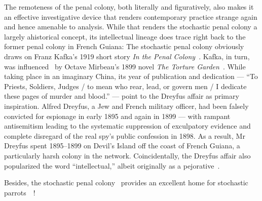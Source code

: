 The remoteness of the penal colony, both literally and figuratively, also makes
it an effective investigative device that renders contemporary practice strange
again and hence amenable to analysis. While that renders the stochastic penal
colony a largely ahistorical concept, its intellectual lineage does trace right
back to the former penal colony in French Guiana: The stochastic penal colony
obviously draws on Franz Kafka's 1919 short story \emph{In the Penal
Colony}~\cite{Kafka1995}. Kafka, in turn, was influenced~\cite{Robertson2017} by
Octave Mirbeau's 1899 novel \emph{The Torture Garden}~\cite{Mirbeau2008}. While
taking place in an imaginary China, its year of publication and dedication ---
``To Priests, Soldiers, Judges / to mean who rear, lead, or govern men / I
dedicate these pages of murder and blood.'' --- point to the Dreyfus affair as
primary inspiration. Alfred Dreyfus, a Jew and French military officer, had been
falsely convicted for espionage in early 1895 and again in 1899 --- with rampant
antisemitism leading to the systematic suppression of exculpatory evidence and
complete disregard of the real spy's public confession in 1898. As a result, Mr
Dreyfus spent 1895--1899 on Devil's Island off the coast of French Guiana, a
particularly harsh colony in the network. Coincidentally, the Dreyfus affair
also popularized the word ``intellectual,'' albeit originally as a
pejorative~\cite{Drake2005,IntellectualsAndTheMediaInFrance2021}.

Besides, the stochastic penal colony~ provides an excellent
home for stochastic parrots~~\cite{BenderGebruea2021}!
